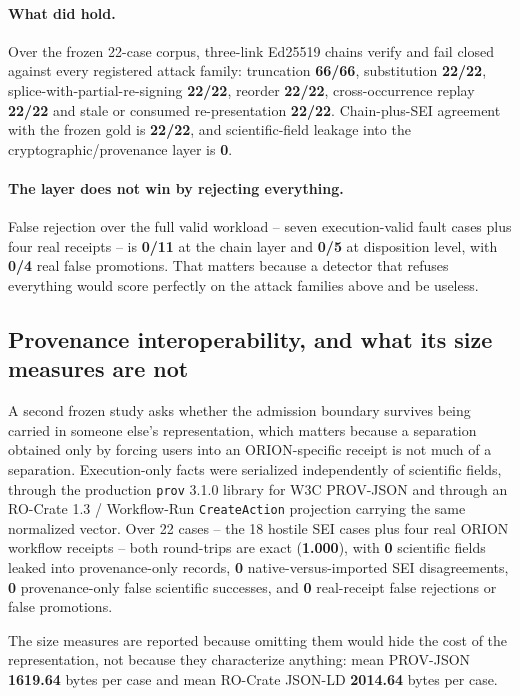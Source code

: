 \paragraph{What did hold.} Over the frozen 22-case corpus, three-link Ed25519
chains verify and fail closed against every registered attack family: truncation
\textbf{66/66}, substitution \textbf{22/22}, splice-with-partial-re-signing
\textbf{22/22}, reorder \textbf{22/22}, cross-occurrence replay \textbf{22/22}
and stale or consumed re-presentation \textbf{22/22}. Chain-plus-SEI agreement
with the frozen gold is \textbf{22/22}, and scientific-field leakage into the
cryptographic/provenance layer is \textbf{0}.

\paragraph{The layer does not win by rejecting everything.} False rejection over
the full valid workload -- seven execution-valid fault cases plus four real
receipts -- is \textbf{0/11} at the chain layer and \textbf{0/5} at disposition
level, with \textbf{0/4} real false promotions. That matters because a detector
that refuses everything would score perfectly on the attack families above and be
useless.

\subsection{Provenance interoperability, and what its size measures are not}

A second frozen study asks whether the admission boundary survives being carried
in someone else's representation, which matters because a separation obtained
only by forcing users into an ORION-specific receipt is not much of a
separation. Execution-only facts were serialized independently of scientific
fields, through the production \texttt{prov} 3.1.0 library for W3C PROV-JSON
and through an RO-Crate 1.3 / Workflow-Run \texttt{CreateAction} projection
carrying the same normalized vector. Over 22 cases -- the 18 hostile SEI cases
plus four real ORION workflow receipts -- both round-trips are exact
(\textbf{1.000}), with \textbf{0} scientific fields leaked into
provenance-only records, \textbf{0} native-versus-imported SEI disagreements,
\textbf{0} provenance-only false scientific successes, and \textbf{0}
real-receipt false rejections or false promotions.

The size measures are reported because omitting them would hide the cost of the
representation, not because they characterize anything: mean PROV-JSON
\textbf{1619.64} bytes per case and mean RO-Crate JSON-LD \textbf{2014.64}
bytes per case.

